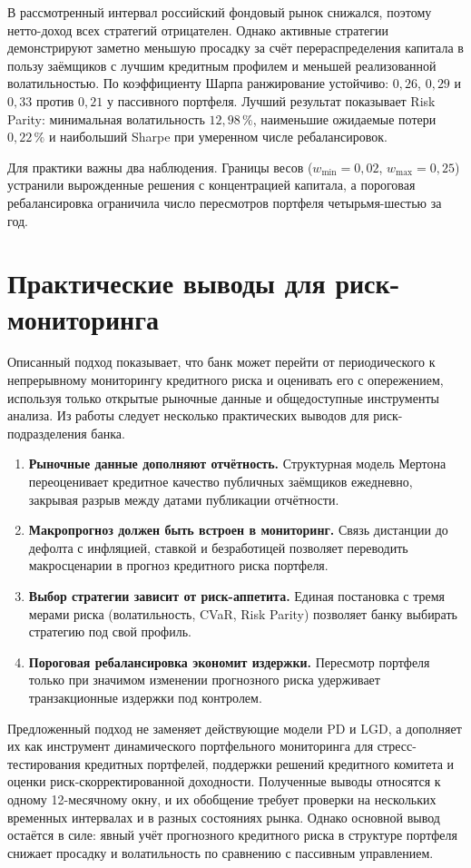 \documentclass[a4paper,12pt]{article}
\begin{document}
В рассмотренный интервал российский фондовый рынок снижался, поэтому нетто-доход всех стратегий
отрицателен. Однако активные стратегии демонстрируют заметно меньшую просадку за счёт
перераспределения капитала в пользу заёмщиков с лучшим кредитным профилем и меньшей реализованной
волатильностью. По коэффициенту Шарпа ранжирование устойчиво: $0{,}26$, $0{,}29$ и $0{,}33$ против
$0{,}21$ у пассивного портфеля. Лучший результат показывает Risk Parity: минимальная волатильность
$12{,}98\,\%$, наименьшие ожидаемые потери $0{,}22\,\%$ и наибольший Sharpe при умеренном числе
ребалансировок.

Для практики важны два наблюдения. Границы весов ($w_{\min} = 0{,}02$,
$w_{\max} = 0{,}25$) устранили вырожденные решения с концентрацией капитала, а пороговая
ребалансировка ограничила число пересмотров портфеля четырьмя-шестью за год.

\section{Практические выводы для риск-мониторинга}

Описанный подход показывает, что банк может перейти от периодического к непрерывному
мониторингу кредитного риска и оценивать его с опережением, используя только открытые
рыночные данные и общедоступные инструменты анализа. Из работы следует несколько
практических выводов для риск-подразделения банка.

\begin{enumerate}[leftmargin=2em, itemsep=3pt]
    \item \textbf{Рыночные данные дополняют отчётность.} Структурная модель Мертона переоценивает
        кредитное качество публичных заёмщиков ежедневно, закрывая разрыв между датами
        публикации отчётности.
    \item \textbf{Макропрогноз должен быть встроен в мониторинг.} Связь дистанции до дефолта
        с инфляцией, ставкой и безработицей позволяет переводить макросценарии в прогноз
        кредитного риска портфеля.
    \item \textbf{Выбор стратегии зависит от риск-аппетита.} Единая постановка с тремя
        мерами риска (волатильность, CVaR, Risk Parity) позволяет банку выбирать стратегию
        под свой профиль.
    \item \textbf{Пороговая ребалансировка экономит издержки.} Пересмотр портфеля только при
        значимом изменении прогнозного риска удерживает транзакционные издержки под контролем.
\end{enumerate}

Предложенный подход не заменяет действующие модели PD и LGD, а дополняет их как
инструмент динамического портфельного мониторинга для стресс-тестирования кредитных
портфелей, поддержки решений кредитного комитета и оценки риск-скорректированной доходности.
Полученные выводы относятся к одному 12-месячному окну, и их обобщение требует проверки
на нескольких временных интервалах и в разных состояниях рынка. Однако основной вывод
остаётся в силе: явный учёт прогнозного кредитного риска в структуре портфеля снижает
просадку и волатильность по сравнению с пассивным управлением.
\end{document}
